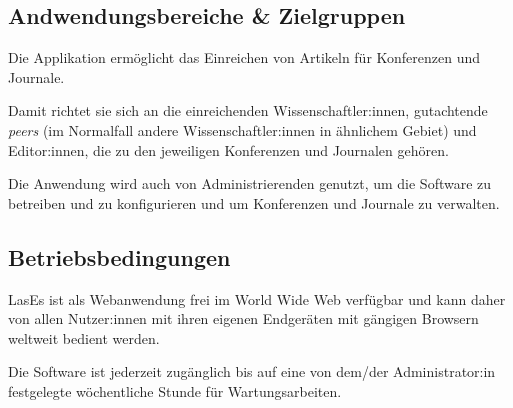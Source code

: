 
\subsection{Andwendungsbereiche \& Zielgruppen}

Die Applikation ermöglicht das Einreichen von Artikeln für Konferenzen und Journale.

Damit richtet sie sich an die einreichenden Wissenschaftler:innen, gutachtende \emph{peers} (im Normalfall andere Wissenschaftler:innen in ähnlichem Gebiet) und Editor:innen, die zu den jeweiligen Konferenzen und Journalen gehören.

Die Anwendung wird auch von Administrierenden genutzt, um die Software zu betreiben und zu konfigurieren und um Konferenzen und Journale zu verwalten.

\subsection{Betriebsbedingungen}

LasEs ist als Webanwendung frei im World Wide Web verfügbar und kann daher von allen Nutzer:innen mit ihren eigenen Endgeräten mit gängigen Browsern weltweit bedient werden.

Die Software ist jederzeit zugänglich bis auf eine von dem/der Administrator:in festgelegte wöchentliche Stunde für Wartungsarbeiten.